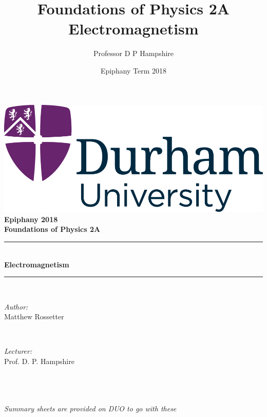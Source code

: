 \documentclass[a4paper, 11pt, normalem]{report}
\title{Foundations of Physics 2A \\ Electromagnetism \vspace{-20pt}}
\author{Professor D P Hampshire}
\date{\vspace{-15pt}Epiphany Term 2018}
\begin{document}
\begin{titlepage}
    \newcommand{\HRule}{\rule{\linewidth}{0.5mm}}
    \center
    {\includegraphics[scale=0.5]{../../logo0.png}\hfill{\Large\bfseries Epiphany 2018}}\\[2.5cm]
    {\LARGE\bfseries Foundations of Physics 2A}\\[1.5cm]
    \HRule \\[0.7cm]
    {\huge\bfseries Electromagnetism}\\[0.4cm]
    \HRule \\[1.5cm]

    \begin{minipage}{0.4\textwidth}
        \begin{flushleft} \large
            \emph{Author:} \\ Matthew Rossetter
        \end{flushleft}
    \end{minipage}~
    \begin{minipage}{0.4\textwidth}
        \begin{flushright} \large
            \emph{Lecturer:} \\ Prof. D. P. Hampshire
        \end{flushright}
    \end{minipage}\\[2cm]
    \vfill
\end{titlepage}
\tableofcontents

\chapter{}

\textit{Summary sheets are provided on DUO to go with these}
\end{document}
